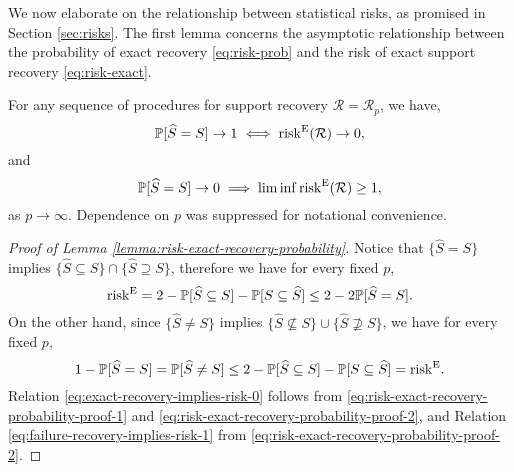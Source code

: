 We now elaborate on the relationship between statistical risks, as promised in Section \ref{sec:risks}.
The first lemma concerns the asymptotic relationship between the probability of exact recovery \eqref{eq:risk-prob} and the risk of exact support recovery \eqref{eq:risk-exact}.

\begin{lemma} \label{lemma:risk-exact-recovery-probability}
For any sequence of procedures for support recovery $\mathcal{R} = \mathcal{R}_p$, we have, 
\begin{equation} \label{eq:exact-recovery-implies-risk-0}
    \P[\widehat{S} = S] \to 1 \iff \mathrm{risk}^{\mathrm{E}}(\mathcal{R})\to0,
\end{equation}
and
\begin{equation} \label{eq:failure-recovery-implies-risk-1}
    \P[\widehat{S} = S] \to 0 \implies \liminf\mathrm{risk}^{\mathrm{E}}(\mathcal{R})\ge1,
\end{equation}
as $p\to\infty$. Dependence on $p$ was suppressed for notational convenience.
\end{lemma}


\begin{proof}[Proof of Lemma \ref{lemma:risk-exact-recovery-probability}]
Notice that $\{\widehat{S}=S\}$ implies $\{\widehat{S}\subseteq S\} \cap \{\widehat{S}\supseteq S\}$, therefore we have for every fixed $p$,
\begin{equation} \label{eq:risk-exact-recovery-probability-proof-1}
    \mathrm{risk}^{\mathrm{E}} 
    = 2 - \P[\widehat{S} \subseteq S] - \P[S \subseteq \widehat{S}] \\
    \le 2 - 2\P[\widehat{S}=S].
\end{equation}
On the other hand, since $\{\widehat{S}\neq S\}$ implies $\{\widehat{S}\not\subseteq S\} \cup \{\widehat{S}\not\supseteq S\}$, we have for every fixed $p$,
\begin{equation} \label{eq:risk-exact-recovery-probability-proof-2}
    1 - \P[\widehat{S}=S]
    = \P[\widehat{S}\neq S]
    \le 2 - \P[\widehat{S} \subseteq S] - \P[S \subseteq \widehat{S}]
    = \mathrm{risk}^{\mathrm{E}}. 
\end{equation}
Relation \eqref{eq:exact-recovery-implies-risk-0} follows from \eqref{eq:risk-exact-recovery-probability-proof-1} and \eqref{eq:risk-exact-recovery-probability-proof-2}, and Relation \eqref{eq:failure-recovery-implies-risk-1} from \eqref{eq:risk-exact-recovery-probability-proof-2}.
\end{proof}

